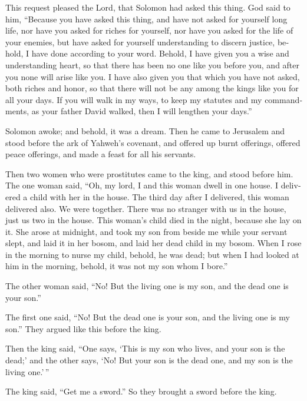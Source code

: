 \begin{paracol}{2}
\begin{otherlanguage}{english}
 This request pleased the Lord, that Solomon had asked
this thing.  God said to him, ``Because you have asked
this thing, and have not asked for yourself long life, nor have you
asked for riches for yourself, nor have you asked for the life of your
enemies, but have asked for yourself understanding to discern justice,
 behold, I have done according to your word. Behold, I
have given you a wise and understanding heart, so that there has been no
one like you before you, and after you none will arise like you.
 I have also given you that which you have not asked,
both riches and honor, so that there will not be any among the kings
like you for all your days.  If you will walk in my ways,
to keep my statutes and my commandments, as your father David walked,
then I will lengthen your days.''

 Solomon awoke; and behold, it was a dream. Then he came
to Jerusalem and stood before the ark of Yahweh's covenant, and offered
up burnt offerings, offered peace offerings, and made a feast for all
his servants.

 Then two women who were prostitutes came to the king,
and stood before him.  The one woman said, ``Oh, my lord,
I and this woman dwell in one house. I delivered a child with her in the
house.  The third day after I delivered, this woman
delivered also. We were together. There was no stranger with us in the
house, just us two in the house.  This woman's child died
in the night, because she lay on it.  She arose at
midnight, and took my son from beside me while your servant slept, and
laid it in her bosom, and laid her dead child in my bosom.
 When I rose in the morning to nurse my child, behold, he
was dead; but when I had looked at him in the morning, behold, it was
not my son whom I bore.''

 The other woman said, ``No! But the living one is my
son, and the dead one is your son.''

The first one said, ``No! But the dead one is your son, and the living
one is my son.'' They argued like this before the king.

 Then the king said, ``One says, `This is my son who
lives, and your son is the dead;' and the other says, `No! But your son
is the dead one, and my son is the living one.'\,''

 The king said, ``Get me a sword.'' So they brought a
sword before the king.


\end{otherlanguage}
\end{paracol}
